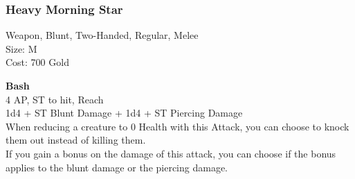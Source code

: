 \subsubsection{Heavy Morning Star}\label{weapon:heavyMorningStar}
Weapon, Blunt, Two-Handed, Regular, Melee\\
Size: M\\
Cost: 700 Gold

\textbf{Bash}\\
4 AP, ST to hit,  Reach\\
1d4 + \texttimes ST Blunt Damage + 1d4 + \texttimes ST Piercing Damage\\
When reducing a creature to 0 Health with this Attack, you can choose to knock them out instead of killing them.\\
If you gain a bonus on the damage of this attack, you can choose if the bonus applies to the blunt damage or the piercing damage.